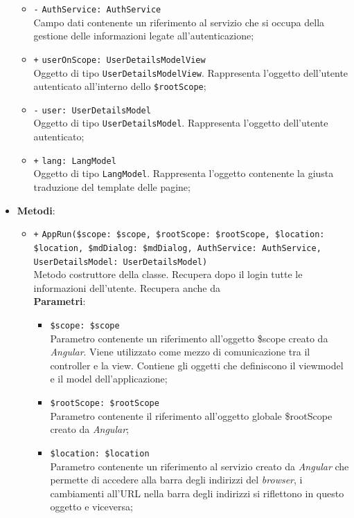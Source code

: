 \begin{itemize}
\begin{itemize}
				\item \texttt{-} \texttt{AuthService: AuthService} \\
				Campo dati contenente un riferimento al servizio che si occupa della gestione delle informazioni legate all’autenticazione;
				\item \texttt{+} \texttt{userOnScope: UserDetailsModelView} \\
				Oggetto di tipo \texttt{UserDetailsModelView}. Rappresenta l'oggetto dell'utente autenticato all'interno dello \texttt{\$rootScope};
				\item \texttt{-} \texttt{user: UserDetailsModel} \\
				Oggetto di tipo \texttt{UserDetailsModel}. Rappresenta l'oggetto dell'utente autenticato;
				\item \texttt{+} \texttt{lang: LangModel} \\
				Oggetto di tipo \texttt{LangModel}. Rappresenta l'oggetto contenente la giusta traduzione del template delle pagine;
			\end{itemize}
			\item \textbf{Metodi}: 
			\begin{itemize}
				\item \texttt{+} \texttt{AppRun(\$scope: \$scope, \$rootScope: \$rootScope, \$location: \$location, \$mdDialog: \$mdDialog, AuthService: AuthService, UserDetailsModel: UserDetailsModel)} \\
				Metodo costruttore della classe. Recupera dopo il login tutte le informazioni dell'utente. Recupera anche da  \\
				\textbf{Parametri}:
				\begin{itemize}
					\item \texttt{\$scope: \$scope} \\
					Parametro contenente un riferimento all’oggetto \$scope creato da \textit{Angular}. Viene utilizzato come mezzo di comunicazione tra il controller e la view. Contiene gli oggetti che definiscono il viewmodel e il model dell’applicazione;
					\item \texttt{\$rootScope: \$rootScope} \\
					Parametro contenente il riferimento all'oggetto globale \$rootScope creato da \textit{Angular};
					\item \texttt{\$location: \$location} \\
					Parametro contenente un riferimento al servizio creato da \textit{Angular} che permette di accedere alla barra degli indirizzi del \textit{browser}, i cambiamenti all’URL nella barra degli indirizzi si riflettono in questo oggetto e viceversa;

\end{itemize}
\end{itemize}
\end{itemize}
